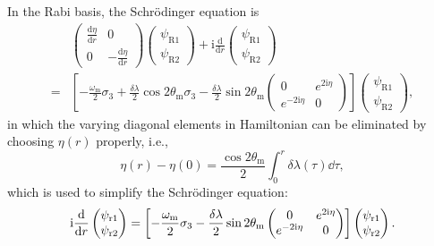 In the Rabi basis, the Schr\"{o}dinger equation is
\begin{align*}
    &\begin{pmatrix}  \frac{\mathrm d\eta}{\mathrm dr}  & 0 \\ 0 & - \frac{\mathrm d\eta}{\mathrm d r}  \end{pmatrix} \begin{pmatrix} \psi_{\mathrm R1} \\ \psi_{\mathrm R2} \end{pmatrix} + \mathrm i \frac{\mathrm d}{\mathrm dr} \begin{pmatrix} \psi_{\mathrm R1} \\ \psi_{\mathrm R2} \end{pmatrix} \\
    =& \left[ -\frac{\omega_{\mathrm m} }{2} \sigma_3  + \frac{\delta \lambda}{2} \cos 2\theta_{\mathrm m}  \sigma_3  - \frac{\delta \lambda}{2} \sin 2\theta_{\mathrm m} \begin{pmatrix} 0 & e^{2\mathrm i\eta} \\ e^{-2 \mathrm i\eta } & 0 \end{pmatrix}   \right] \begin{pmatrix} \psi_{\mathrm R1} \\ \psi_{\mathrm R2} \end{pmatrix},
\end{align*}
in which the varying diagonal elements in Hamiltonian can be eliminated by choosing $\eta(r)$ properly, i.e.,
\begin{equation}
    \eta(r) - \eta(0) =  \frac{\cos 2\theta_{\mathrm{m}}}{2} \int_0^r \delta\lambda (\tau) \dd\tau,
\end{equation}
which is used to simplify the Schr\"{o}dinger equation:
\begin{equation*}
    \mathrm{i} \frac{\mathrm d}{\mathrm d r} \begin{pmatrix} \psi_{\mathrm r1} \\ \psi_{\mathrm r2} \end{pmatrix} = \left[ - \frac{\omega_{\mathrm m}}{2} \sigma_3 - \frac{\delta \lambda}{2} \sin 2\theta_{\mathrm m} \begin{pmatrix} 0 & e^{2\mathrm{i}\eta} \\ e^{-2 \mathrm{i} \eta } & 0 \end{pmatrix}\right] \begin{pmatrix} \psi_{\mathrm r1} \\ \psi_{\mathrm r2} \end{pmatrix}.
\end{equation*}


